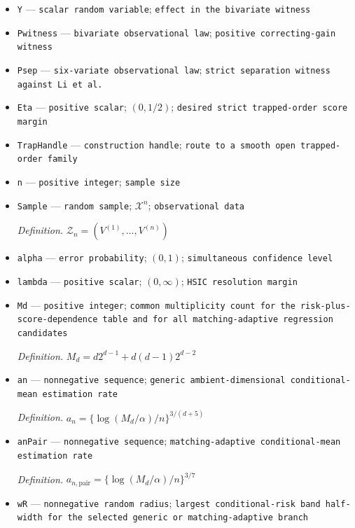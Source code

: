 \documentclass{article}
\begin{document}
\begin{itemize}
  \item \texttt{Y} --- \texttt{scalar random variable}; \texttt{effect in the bivariate witness}
  \item \texttt{Pwitness} --- \texttt{bivariate observational law}; \texttt{positive correcting-\allowbreak{}gain witness}
  \item \texttt{Psep} --- \texttt{six-\allowbreak{}variate observational law}; \texttt{strict separation witness against Li et al.}
  \item \texttt{Eta} --- \texttt{positive scalar}; \((0,1/2)\); \texttt{desired strict trapped-\allowbreak{}order score margin}
  \item \texttt{TrapHandle} --- \texttt{construction handle}; \texttt{route to a smooth open trapped-\allowbreak{}order family}
  \item \texttt{n} --- \texttt{positive integer}; \texttt{sample size}
  \item \texttt{Sample} --- \texttt{random sample}; \(\mathcal X^n\); \texttt{observational data}
  \par\smallskip\noindent\emph{Definition.} \(\mathcal Z_n=(V^{(1)},\ldots,V^{(n)})\)
  \item \texttt{alpha} --- \texttt{error probability}; \((0,1)\); \texttt{simultaneous confidence level}
  \item \texttt{lambda} --- \texttt{positive scalar}; \((0,\infty)\); \texttt{HSIC resolution margin}
  \item \texttt{Md} --- \texttt{positive integer}; \texttt{common multiplicity count for the risk-\allowbreak{}plus-\allowbreak{}score-\allowbreak{}dependence table and for all matching-\allowbreak{}adaptive regression candidates}
  \par\smallskip\noindent\emph{Definition.} \(M_d=d2^{d-1}+d(d-1)2^{d-2}\)
  \item \texttt{an} --- \texttt{nonnegative sequence}; \texttt{generic ambient-\allowbreak{}dimensional conditional-\allowbreak{}mean estimation rate}
  \par\smallskip\noindent\emph{Definition.} \(a_n=\{\log(M_d/\alpha)/n\}^{3/(d+5)}\)
  \item \texttt{anPair} --- \texttt{nonnegative sequence}; \texttt{matching-\allowbreak{}adaptive conditional-\allowbreak{}mean estimation rate}
  \par\smallskip\noindent\emph{Definition.} \(a_{n,\mathrm{pair}}=\{\log(M_d/\alpha)/n\}^{3/7}\)
  \item \texttt{wR} --- \texttt{nonnegative random radius}; \texttt{largest conditional-\allowbreak{}risk band half-\allowbreak{}width for the selected generic or matching-\allowbreak{}adaptive branch}

\end{itemize}
\end{document}

